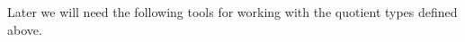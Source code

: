 Later we will need the following tools for working with the quotient types defined above.
\ccpad
\begin{code}%
\>[1]\AgdaSpace{}%
\AgdaSymbol{:}\AgdaSpace{}%
\AgdaSymbol{\{}\AgdaSpace{}%
\AgdaSpace{}%
\AgdaSymbol{:}\AgdaSpace{}%
\AgdaSymbol{\}\{}\AgdaSpace{}%
\AgdaSymbol{:}\AgdaSpace{}%
\AgdaSpace{}%
\AgdaSpace{}%
\AgdaSymbol{\}}\AgdaSpace{}%
\AgdaSpace{}%
\AgdaSpace{}%
\AgdaSpace{}%
\AgdaSpace{}%
\AgdaSpace{}%
\AgdaSpace{}%
\AgdaSpace{}%
%
\>[64]\AgdaOperator{\AgdaFunction{[}}\AgdaSpace{}%
\AgdaSpace{}%
\AgdaOperator{\AgdaFunction{]}}\AgdaSpace{}%
%
\>[73]%
\>[76]\AgdaOperator{\AgdaFunction{[}}\AgdaSpace{}%
\AgdaSpace{}%
\AgdaOperator{\AgdaFunction{]}}\AgdaSpace{}%
\<%
\\
%
\>[1]\AgdaSpace{}%
\AgdaSymbol{\{}\AgdaSymbol{\}\{}\AgdaSymbol{\}}\AgdaSpace{}%
\AgdaSpace{}%
\AgdaSpace{}%
\AgdaSymbol{\{}\AgdaSymbol{\}}\AgdaSpace{}%
\AgdaSpace{}%
\AgdaSymbol{=}\AgdaSpace{}%
\AgdaSymbol{(}\AgdaSpace{}%
\AgdaSymbol{)}\AgdaSpace{}%
\AgdaSpace{}%
\AgdaSpace{}%
\AgdaSpace{}%
\AgdaSymbol{(}\AgdaSpace{}%
\AgdaSpace{}%
\AgdaSpace{}%
\AgdaSpace{}%
\AgdaSymbol{)}\AgdaSpace{}%
\<%
\\
%
\\[\AgdaEmptyExtraSkip]%
%
\>[1]\AgdaSpace{}%
\AgdaSymbol{:}\AgdaSpace{}%
\AgdaSymbol{\{}\AgdaSpace{}%
\AgdaSpace{}%
\AgdaSymbol{:}\AgdaSpace{}%
\AgdaSymbol{\}\{}\AgdaSpace{}%
\AgdaSymbol{:}\AgdaSpace{}%
\AgdaSpace{}%
\AgdaSpace{}%
\AgdaSymbol{\}}\AgdaSpace{}%
\AgdaSpace{}%
\AgdaSpace{}%
\AgdaSpace{}%
\AgdaSpace{}%
\AgdaSpace{}%
\AgdaSpace{}%
\AgdaSpace{}%
%
\>[64]\AgdaOperator{\AgdaFunction{[}}\AgdaSpace{}%
\AgdaSpace{}%
\AgdaOperator{\AgdaFunction{]}}\AgdaSpace{}%
\AgdaSpace{}%
\AgdaSpace{}%

\end{code}
